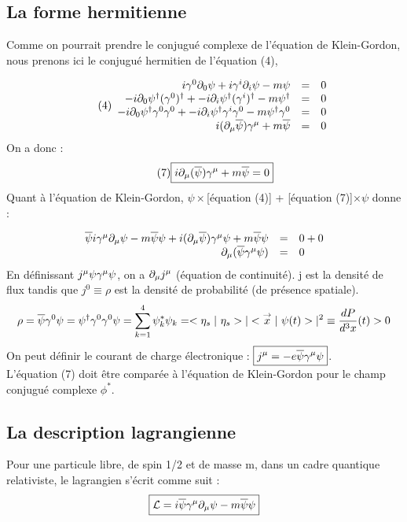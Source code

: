 \subsection{La forme hermitienne}

Comme on pourrait prendre le conjugué complexe de l’équation de Klein-Gordon,
nous prenons ici le conjugué hermitien de l’équation (4),

\[\tag{4}\begin{array}{ r c l }
i\gamma^0\partial_0\psi+i\gamma^i\partial_i\psi-m\psi & = & 0 \\
-i\partial_0\psi^\dagger(\gamma^0)^\dagger+-i\partial_i\psi^\dagger(\gamma^i)^\dagger-
  m\psi^\dagger & = & 0 \\
-i\partial_0\psi^\dagger\gamma^0\gamma^0+-i\partial_i\psi^\dagger\gamma^i\gamma^0-
  m\psi^\dagger\gamma^0 & = & 0 \\
i(\partial_\mu\overline{\psi})\gamma^\mu+m\overline{\psi} & = & 0 \\
\end{array}\]
On a donc :
\[
\tag{7} \boxed{
i\partial_\mu(\overline{\psi})\gamma^\mu+m\overline{\psi}=0
}
\]
Quant à l’équation de Klein-Gordon, $\psi\times$[équation (4)]
 + [équation (7)]$\times\psi$ donne :

\[\begin{array}{ r c l }
\overline{\psi}i\gamma^\mu\partial_\mu\psi-m\overline{\psi}\psi+
i(\partial_\mu\overline{\psi})\gamma^\mu\psi+m\overline{\psi}\psi & = & 0+0 \\
\partial_\mu(\overline{\psi}\gamma^\mu\psi) & = & 0 \\
\end{array}\]
En définissant $j^\mu\psi\gamma^\mu\psi$, on a $\partial_\mu j^\mu$ (équation de
continuité). j est la densité de flux tandis que $j^0\equiv\rho$ est la
densité de probabilité (de présence spatiale).
\[
\rho=\overline{\psi}\gamma^0\psi=\psi^\dagger\gamma^0\gamma^0\psi=\sum_{k=1}^4
\psi^*_k\psi_k=<{\eta_s}\;|\ {\eta_s}>|<{{\overset{\rightarrow}{x}}}\;|\ {\psi(t)}>|^2\equiv\frac{dP}{d^3x}(t)>0
\]
On peut définir le courant de charge électronique : $\boxed{j^\mu =
-e\overline{\psi}\gamma^\mu\psi}$.\\

L'équation (7) doit être comparée à l'équation de Klein-Gordon pour le champ
conjugué complexe $\phi^*$.
\subsection{La description lagrangienne}
Pour une particule libre, de spin 1/2 et de masse m, dans un cadre quantique relativiste, le lagrangien s'écrit
comme suit :
\[\boxed{\mathcal{L}=i\overline{\psi}\gamma^\mu\partial_\mu\psi-m\overline{\psi}\psi}\]

